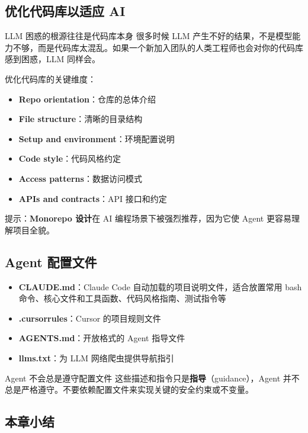 \documentclass[a4paper]{article}
\begin{document}
\subsection{优化代码库以适应 AI}

\begin{warningbox}{LLM 困惑的根源往往是代码库本身}
很多时候 LLM 产生不好的结果，不是模型能力不够，而是代码库太混乱。如果一个新加入团队的人类工程师也会对你的代码库感到困惑，LLM 同样会。
\end{warningbox}

优化代码库的关键维度：
\begin{itemize}
    \item \textbf{Repo orientation}：仓库的总体介绍
    \item \textbf{File structure}：清晰的目录结构
    \item \textbf{Setup and environment}：环境配置说明
    \item \textbf{Code style}：代码风格约定
    \item \textbf{Access patterns}：数据访问模式
    \item \textbf{APIs and contracts}：API 接口和约定
\end{itemize}

提示：\textbf{Monorepo 设计}在 AI 编程场景下被强烈推荐，因为它使 Agent 更容易理解项目全貌。

\subsection{Agent 配置文件}

\begin{itemize}
    \item \textbf{CLAUDE.md}：Claude Code 自动加载的项目说明文件，适合放置常用 bash 命令、核心文件和工具函数、代码风格指南、测试指令等
    \item \textbf{.cursorrules}：Cursor 的项目规则文件
    \item \textbf{AGENTS.md}：开放格式的 Agent 指导文件
    \item \textbf{llms.txt}：为 LLM 网络爬虫提供导航指引
\end{itemize}

\begin{warningbox}{Agent 不会总是遵守配置文件}
这些描述和指令只是\textbf{指导}（guidance），Agent 并不总是严格遵守。不要依赖配置文件来实现关键的安全约束或不变量。
\end{warningbox}

\subsection{本章小结}
\end{document}
